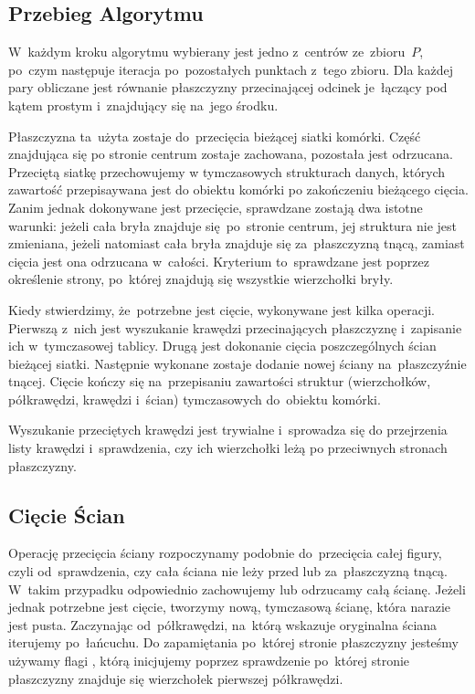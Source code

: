 \documentclass[skorowidz,autorrok,backref,xodstep,oswiadczenie]{wmimgr}
\begin{document}
\subsection{Przebieg Algorytmu}

W~każdym kroku algorytmu wybierany jest jedno z~centrów ze~zbioru~$P$, po~czym następuje iteracja po~pozostałych punktach z~tego zbioru. Dla każdej pary obliczane jest równanie płaszczyzny przecinającej odcinek je~łączący pod kątem prostym i~znajdujący się na~jego środku.

Płaszczyzna ta~użyta zostaje do~przecięcia bieżącej siatki komórki. Część znajdująca się po stronie centrum zostaje zachowana, pozostała jest odrzucana. Przeciętą siatkę przechowujemy w tymczasowych strukturach danych, których zawartość przepisaywana jest do obiektu komórki po zakończeniu bieżącego cięcia. Zanim jednak dokonywane jest przecięcie, sprawdzane zostają dwa istotne warunki: jeżeli cała bryła znajduje się~po~stronie centrum, jej struktura nie jest zmieniana, jeżeli natomiast cała bryła znajduje się za~płaszczyzną tnącą, zamiast cięcia jest ona odrzucana w~całości. Kryterium to~sprawdzane jest poprzez określenie strony, po~której znajdują się wszystkie wierzchołki bryły.

Kiedy stwierdzimy, że~potrzebne jest cięcie, wykonywane jest kilka operacji. Pierwszą z~nich jest wyszukanie krawędzi przecinających płaszczyznę i~zapisanie ich w~tymczasowej tablicy. Drugą jest dokonanie cięcia poszczególnych ścian bieżącej siatki. Następnie wykonane zostaje dodanie nowej ściany na~płaszczyźnie tnącej. Cięcie kończy się na~przepisaniu zawartości struktur (wierzchołków, półkrawędzi, krawędzi i~ścian) tymczasowych do~obiektu komórki.

Wyszukanie przeciętych krawędzi jest trywialne i~sprowadza się do przejrzenia listy krawędzi i~sprawdzenia, czy ich wierzchołki leżą po przeciwnych stronach płaszczyzny.

\subsection{Cięcie Ścian}

Operację przecięcia ściany rozpoczynamy podobnie do~przecięcia całej figury, czyli od~sprawdzenia, czy cała ściana nie leży przed lub za~płaszczyzną tnącą. W~takim przypadku odpowiednio zachowujemy lub odrzucamy całą ścianę. Jeżeli jednak potrzebne jest cięcie, tworzymy nową, tymczasową ścianę, która narazie jest pusta. Zaczynając od~półkrawędzi, na~którą wskazuje oryginalna ściana iterujemy po~łańcuchu. Do zapamiętania po~której stronie płaszczyzny jesteśmy używamy flagi , którą inicjujemy poprzez sprawdzenie po~której stronie płaszczyzny znajduje się wierzchołek pierwszej półkrawędzi.
\end{document}
